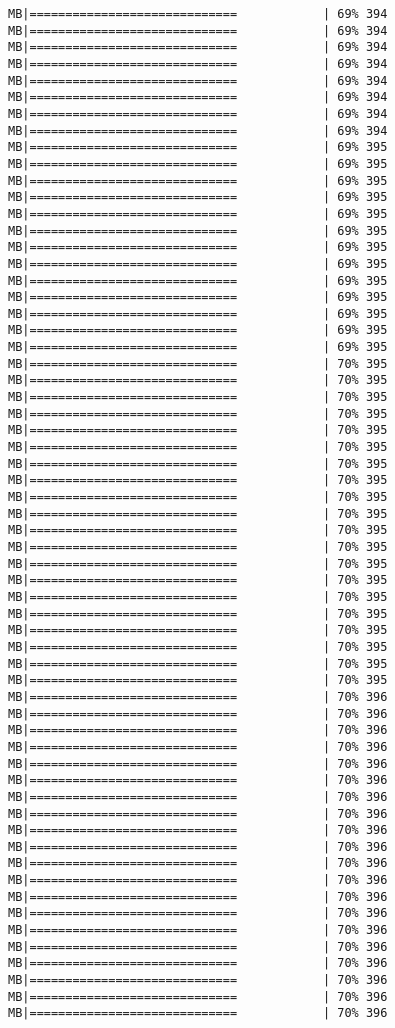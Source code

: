 \documentclass[
]{article}
\begin{document}
\begin{verbatim}
MB|=============================            | 69% 394 MB|=============================            | 69% 394 MB|=============================            | 69% 394 MB|=============================            | 69% 394 MB|=============================            | 69% 394 MB|=============================            | 69% 394 MB|=============================            | 69% 394 MB|=============================            | 69% 394 MB|=============================            | 69% 395 MB|=============================            | 69% 395 MB|=============================            | 69% 395 MB|=============================            | 69% 395 MB|=============================            | 69% 395 MB|=============================            | 69% 395 MB|=============================            | 69% 395 MB|=============================            | 69% 395 MB|=============================            | 69% 395 MB|=============================            | 69% 395 MB|=============================            | 69% 395 MB|=============================            | 69% 395 MB|=============================            | 69% 395 MB|=============================            | 70% 395 MB|=============================            | 70% 395 MB|=============================            | 70% 395 MB|=============================            | 70% 395 MB|=============================            | 70% 395 MB|=============================            | 70% 395 MB|=============================            | 70% 395 MB|=============================            | 70% 395 MB|=============================            | 70% 395 MB|=============================            | 70% 395 MB|=============================            | 70% 395 MB|=============================            | 70% 395 MB|=============================            | 70% 395 MB|=============================            | 70% 395 MB|=============================            | 70% 395 MB|=============================            | 70% 395 MB|=============================            | 70% 395 MB|=============================            | 70% 395 MB|=============================            | 70% 395 MB|=============================            | 70% 395 MB|=============================            | 70% 396 MB|=============================            | 70% 396 MB|=============================            | 70% 396 MB|=============================            | 70% 396 MB|=============================            | 70% 396 MB|=============================            | 70% 396 MB|=============================            | 70% 396 MB|=============================            | 70% 396 MB|=============================            | 70% 396 MB|=============================            | 70% 396 MB|=============================            | 70% 396 MB|=============================            | 70% 396 MB|=============================            | 70% 396 MB|=============================            | 70% 396 MB|=============================            | 70% 396 MB|=============================            | 70% 396 MB|=============================            | 70% 396 MB|=============================            | 70% 396 MB|=============================            | 70% 396 MB|=============================            | 70% 396 
\end{verbatim}
\end{document}
